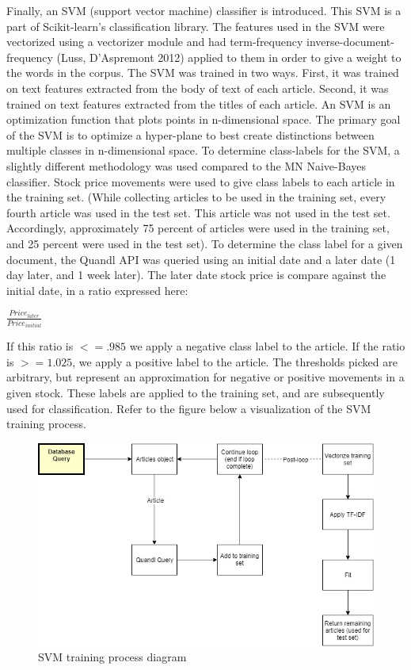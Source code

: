 \documentclass{article}
\begin{document}
    \medskip
    
    Finally, an SVM (support vector machine) classifier is introduced. This SVM is a part of Scikit-learn's classification library. The features used in the SVM were vectorized using a vectorizer module and had term-frequency inverse-document-frequency (Luss, D'Aspremont 2012) applied to them in order to give a weight to the words in the corpus. The SVM was trained in two ways. First, it was trained on text features extracted from the body of text of each article. Second, it was trained on text features extracted from the titles of each article. An SVM is an optimization function that plots points in n-dimensional space. The primary goal of the SVM is to optimize a hyper-plane to best create distinctions between multiple classes in n-dimensional space. To determine class-labels for the SVM, a slightly different methodology was used compared to the MN Naive-Bayes classifier. Stock price movements were used to give class labels to each article in the training set. (While collecting articles to be used in the training set, every fourth article was used in the test set. This article was not used in the test set. Accordingly, approximately 75 percent of articles were used in the training set, and 25 percent were used in the test set). To determine the class label for a given document, the Quandl API was queried using an initial date and a later date (1 day later, and 1 week later). The later date stock price is compare against the initial date, in a ratio expressed here:
    
    $
    \frac{Price_{later}}{Price_{initial}}
    $
    
    If this ratio is $<= .985$ we apply a negative class label to the article. If the ratio is $>= 1.025$, we apply a positive label to the article. The thresholds picked are arbitrary, but represent an approximation for negative or positive movements in a given stock. These labels are applied to the training set, and are subsequently used for classification. Refer to the figure below a visualization of the SVM training process.
    
    
    
    \begin{figure}
        \centering
        \includegraphics[width=\linewidth]{SVMtraining.jpg}
        \caption{SVM training process diagram}
        \label{SVM training}
    \end{figure}
    
\end{document}
